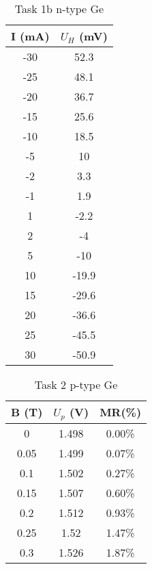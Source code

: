 \documentclass[11pt]{article}
\begin{document}
	\begin{table}[htbp]
		\centering
		\caption{Task 1b n-type Ge}
		\begin{tabular}{cc}
			\toprule
			I (mA) & $U_H$ (mV) \\
			\midrule
			-30 & 52.3 \\
			-25 & 48.1 \\
			-20 & 36.7 \\
			-15 & 25.6 \\
			-10 & 18.5 \\
			-5 & 10 \\
			-2 & 3.3 \\
			-1 & 1.9 \\
			1 & -2.2 \\
			2 & -4 \\
			5 & -10 \\
			10 & -19.9 \\
			15 & -29.6 \\
			20 & -36.6 \\
			25 & -45.5 \\
			30 & -50.9 \\
			\bottomrule
		\end{tabular}%
		\label{tab:4}%
	\end{table}%
	
	\begin{table}[htbp]
		\centering
		\caption{Task 2 p-type Ge}
		\begin{tabular}{ccc}
			\toprule
			B (T) & $U_p$ (V) & MR(\%) \\
			\midrule
			0 & 1.498 & 0.00\% \\
			0.05 & 1.499 & 0.07\% \\
			0.1 & 1.502 & 0.27\% \\
			0.15 & 1.507 & 0.60\% \\
			0.2 & 1.512 & 0.93\% \\
			0.25 & 1.52 & 1.47\% \\
			0.3 & 1.526 & 1.87\% \\
			\bottomrule
		\end{tabular}%
		\label{tab:5}%
	\end{table}%
	
\end{document}
